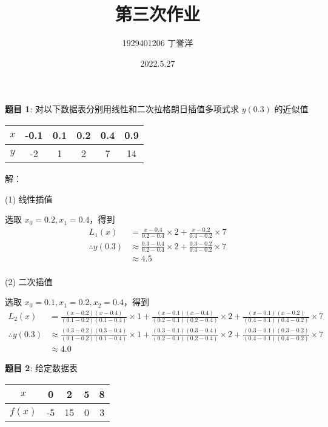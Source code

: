 \documentclass{article}
\title{第三次作业}
\author{1929401206 丁誉洋}
\date{2022.5.27}
\begin{document}
\maketitle

\noindent\textbf{题目 1}: 对以下数据表分别用线性和二次拉格朗日插值多项式求 $y(0.3)$ 的近似值

\begin{center}
    \begin{tabular}{|c|c|c|c|c|c|}
        \hline
        $x$ & -0.1 & 0.1 & 0.2 & 0.4 & 0.9 \\
        \hline
        $y$ & -2 & 1 & 2 & 7 & 14 \\
        \hline
    \end{tabular}
\end{center}

\noindent 解：

\noindent (1) 线性插值

选取 $x_0 = 0.2, x_1 = 0.4$，得到
$$
\begin{aligned}
L_1(x) &= \frac{x - 0.4}{0.2 - 0.4}\times 2 + \frac{x - 0.2}{0.4 - 0.2}\times 7 \\
\therefore y(0.3) &\approx \frac{0.3 - 0.4}{0.2 - 0.4}\times 2 + \frac{0.3 - 0.2}{0.4 - 0.2}\times 7 \\
&\approx 4.5 \\
\end{aligned}
$$

\noindent (2) 二次插值

选取 $x_0 = 0.1, x_1 = 0.2, x_2 = 0.4$，得到
$$
\begin{aligned}
L_2(x) &= \frac{(x - 0.2)(x - 0.4)}{(0.1 - 0.2)(0.1 - 0.4)}\times 1 + \frac{(x - 0.1)(x - 0.4)}{(0.2 - 0.1)(0.2 - 0.4)}\times 2 + \frac{(x - 0.1)(x - 0.2)}{(0.4 - 0.1)(0.4 - 0.2)}\times 7 \\
\therefore y(0.3) &\approx \frac{(0.3 - 0.2)(0.3 - 0.4)}{(0.1 - 0.2)(0.1 - 0.4)}\times 1 + \frac{(0.3 - 0.1)(0.3 - 0.4)}{(0.2 - 0.1)(0.2 - 0.4)}\times 2 + \frac{(0.3 - 0.1)(0.3 - 0.2)}{(0.4 - 0.1)(0.4 - 0.2)}\times 7 \\
&\approx 4.0
\end{aligned}
$$

\noindent\textbf{题目 2}: 给定数据表

\begin{center}
    \begin{tabular}{|c|c|c|c|c|}
        \hline
        $x$ & 0 & 2 & 5 & 8 \\
        \hline
        $f(x)$ & -5 & 15 & 0 & 3 \\
        \hline
    \end{tabular}
\end{center}
\end{document}
